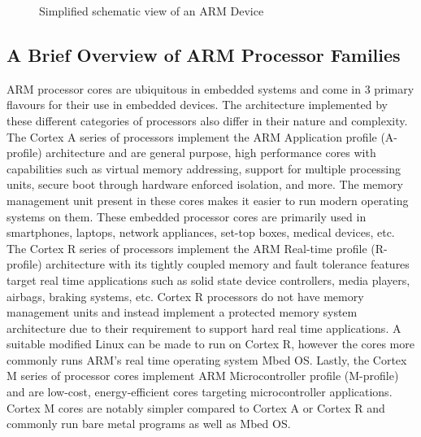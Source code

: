 \begin{figure}[h]
	\caption{Simplified schematic view of an ARM Device}
	\label{fig:arm-scheme}
\end{figure}

\subsection{A Brief Overview of ARM Processor Families}

ARM processor cores are ubiquitous in embedded systems and come in 3 primary flavours for their use in embedded devices. The architecture implemented by these different categories of processors also differ in their nature and complexity. The Cortex A series of processors implement the ARM Application profile (A-profile) architecture and are general purpose, high performance cores with capabilities such as virtual memory addressing, support for multiple processing units, secure boot through hardware enforced isolation, and more. The memory management unit present in these cores makes it easier to run modern operating systems on them. These embedded processor cores are primarily used in smartphones, laptops, network appliances, set-top boxes, medical devices, etc. The Cortex R series of processors implement the ARM Real-time profile (R-profile) architecture with its tightly coupled memory and fault tolerance features target real time applications such as solid state device controllers, media players, airbags, braking systems, etc. Cortex R processors do not have memory management units and instead implement a protected memory system architecture due to their requirement to support hard real time applications. A suitable modified Linux can be made to run on Cortex R, however the cores more commonly runs ARM's real time operating system Mbed OS. Lastly, the Cortex M series of processor cores implement ARM Microcontroller profile (M-profile) and are low-cost, energy-efficient cores targeting microcontroller applications. Cortex M cores are notably simpler compared to Cortex A or Cortex R and commonly run bare metal programs as well as Mbed OS.


